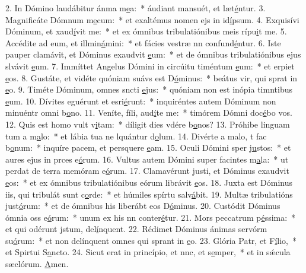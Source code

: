 2. In Dómino laudábitur ánma m\uline{e}a:~* áudiant mansuét, et læt\uline{é}ntur.
3. Magnificáte Dómnum m\uline{e}cum:~* et exaltémus nomen ejs in id\uline{í}psum.
4. Exquisívi Dóminum, et xaud\uline{í}vit me:~* et ex ómnibus tribulatiónibus meis rípu\uline{i}t me.
5. Accédite ad eum, et illmin\uline{á}mini:~* et fácies vestræ nn confund\uline{é}ntur.
6. Iste pauper clamávit, et Dóminus exaudvit \uline{e}um:~* et de ómnibus tribulatiónibus ejus slvávit \uline{e}um.
7. Immíttet Angelus Dómini in circúitu timéntum \uline{e}um:~* et erpiet \uline{e}os.
8. Gustáte, et vidéte quóniam suávs est D\uline{ó}minus:~* beátus vir, qui sprat in \uline{e}o.
9. Timéte Dóminum, omnes sncti \uline{e}jus:~* quóniam non est inópia timntibus \uline{e}um.
10. Dívites eguérunt et esri\uline{é}runt:~* inquiréntes autem Dóminum non minuéntr omni b\uline{o}no.
11. Veníte, fíli, aud\uline{í}te me:~* timórem Dómni doc\uline{é}bo vos.
12. Quis est homo  vult v\uline{i}tam:~* díligit dies vdére b\uline{o}nos?
13. Próhibe linguam tum a m\uline{a}lo:~* et lábia tua ne lquántur d\uline{o}lum.
14. Divérte a malo, t fac b\uline{o}num:~* inquíre pacem, et persquere \uline{e}am.
15. Oculi Dómini sper j\uline{u}stos:~* et aures ejus in prces e\uline{ó}rum.
16. Vultus autem Dómini super facintes m\uline{a}la:~* ut perdat de terra memóram e\uline{ó}rum.
17. Clamavérunt justi, et Dóminus exaudvit \uline{e}os:~* et ex ómnibus tribulatiónibus eórum librávit \uline{e}os.
18. Juxta est Dóminus iis, qui tribulát sunt c\uline{o}rde:~* et húmiles spírtu salv\uline{á}bit.
19. Multæ tribulatións just\uline{ó}rum:~* et de ómnibus his liberábt eos D\uline{ó}minus.
20. Custódit Dóminus ómnia oss e\uline{ó}rum:~* unum ex his nn conter\uline{é}tur.
21. Mors peccatrum p\uline{é}ssima:~* et qui odérunt jstum, del\uline{í}nquent.
22. Rédimet Dóminus ánimas servórm su\uline{ó}rum:~* et non delínquent omnes qui sprant in \uline{e}o.
23. Glória Patr, et F\uline{í}lio,~* et Spirtui S\uline{a}ncto.
24. Sicut erat in princípio, et nnc, et s\uline{e}mper,~* et in sǽcula sæclórum. \uline{A}men.
